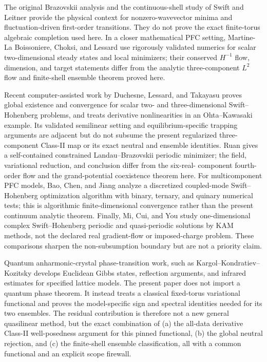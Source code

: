 \documentclass[11pt]{article}
\numberwithin{equation}{section}
\theoremstyle{definition}
\begin{document}
The original Brazovskii analysis \cite{Brazovskii} and the continuous-shell
study of Swift and Leitner \cite{SwiftLeitner} provide the physical context
for nonzero-wavevector minima and fluctuation-driven first-order transitions.
They do not prove the exact finite-torus algebraic completion used here.  In a
closer mathematical PFC setting, Martine-La Boissoniere, Choksi, and Lessard
\cite{MLL} use rigorously validated numerics for scalar two-dimensional
steady states and local minimizers; their conserved $H^{-1}$ flow, dimension,
and target statements differ from the analytic three-component $L^2$ flow and
finite-shell ensemble theorem proved here.

Recent computer-assisted work by Duchesne, Lessard, and Takayasu
\cite{DuchesneLessardTakayasu} proves global existence and convergence for
scalar two- and three-dimensional Swift--Hohenberg problems, and treats
derivative nonlinearities in an Ohta--Kawasaki example.  Its validated
semilinear setting and equilibrium-specific trapping arguments are adjacent
but do not subsume the present regularized three-component Class-II map or its
exact neutral and ensemble identities.  Ruan \cite{RuanLandauBrazovskii}
gives a self-contained constrained Landau--Brazovskii periodic minimizer;
the field, variational reduction, and conclusion differ from the six-real-
component fourth-order flow and the grand-potential coexistence theorem here.
For multicomponent PFC models, Bao, Chen, and Jiang
\cite{BaoChenJiang} analyze a discretized coupled-mode Swift--Hohenberg
optimization algorithm with binary, ternary, and quinary numerical tests;
this is algorithmic finite-dimensional convergence rather than the present
continuum analytic theorem.  Finally, Mi, Cui, and You
\cite{MiCuiYou} study one-dimensional complex Swift--Hohenberg periodic and
quasi-periodic solutions by KAM methods, not the declared real gradient-flow
or imposed-charge problem.  These comparisons sharpen the non-subsumption
boundary but are not a priority claim.


Quantum anharmonic-crystal phase-transition work, such as
Kargol--Kondratiev--Kozitsky \cite{KKK} develops Euclidean Gibbs states, reflection
arguments, and infrared estimates for specified lattice models.  The present
paper does not import a quantum phase theorem.  It instead treats a classical
fixed-torus variational functional and proves the model-specific sign and
spectral identities needed for its two ensembles.  The residual contribution
is therefore not a new general quasilinear method, but the exact combination
of (a) the all-data derivative Class-II well-posedness argument for this
pinned functional, (b) the global neutral rejection, and (c) the finite-shell
ensemble classification, all with a common functional and an explicit scope
firewall.
\end{document}
